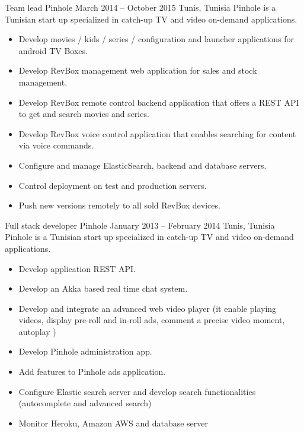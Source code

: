 \documentclass[10pt,a4paper]{resume-settings}
\begin{document}
\cvevent
    {Team lead}
    {Pinhole}
    {March 2014 -- October 2015}
    {Tunis, Tunisia}
    {Pinhole is a Tunisian start up specialized in catch-up TV and video on-demand applications.}
    \begin{itemize}
        \item Develop movies / kids / series / configuration and launcher applications for android TV Boxes.
        \item Develop RevBox management web application for sales and stock management.
        \item Develop RevBox remote control backend application that offers a REST API to get and search movies and series.
        \item Develop RevBox voice control application that enables searching for content via voice commands.
        \item Configure and manage ElasticSearch, backend and database servers.
        \item Control deployment on test and production servers.
        \item Push new versions remotely to all sold RevBox devices.
    \end{itemize}
\divider

\cvevent
    {Full stack developer}
    {Pinhole}
    {January 2013 -- February 2014}
    {Tunis, Tunisia}
    {Pinhole is a Tunisian start up specialized in catch-up TV and video on-demand applications.}
    \begin{itemize}
        \item Develop application REST API.
        \item Develop an Akka based real time chat system.
        \item Develop and integrate an advanced web video player (it enable playing videos, display pre-roll and in-roll ads, comment a precise video moment, autoplay )
        \item Develop Pinhole administration app.
        \item Add features to Pinhole ads application.
        \item Configure Elastic search server and develop search functionalities (autocomplete and advanced search)
        \item Monitor Heroku, Amazon AWS and database server
    \end{itemize}
\divider
\end{document}
